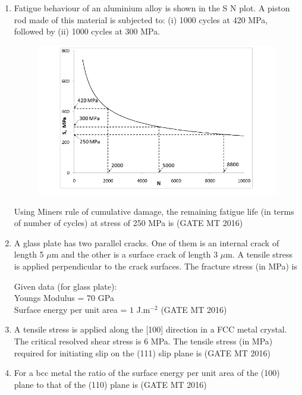 \documentclass[11pt, letterpaper]{article}
\theoremstyle{remark}
\begin{document}
\begin{enumerate}
\item Fatigue behaviour of an aluminium alloy is shown in the S N plot. A piston rod made of this material is subjected to:  
(i) 1000 cycles at 420 MPa, followed by  
(ii) 1000 cycles at 300 MPa.  
\begin{figure}[H]
    \centering
    \includegraphics[width=1\linewidth]{figs/image7'.png}
    \caption{}
    \label{fig:placeholder}
\end{figure}

Using Miner\textquotesingle s rule of cumulative damage, the remaining fatigue life (in terms of number of cycles) at stress of 250 MPa is
\hfill(GATE MT 2016)

\item A glass plate has two parallel cracks. One of them is an internal crack of length 5 $\mu$m and the other is a surface crack of length 3 $\mu$m. A tensile stress is applied perpendicular to the crack surfaces. The fracture stress (in MPa) is  

\noindent Given data (for glass plate):\\  
Young\textquotesingle s Modulus = $70$ GPa \\ 
Surface energy per unit area = $1$ J.m$^{-2}$  
\hfill(GATE MT 2016)

\item A tensile stress is applied along the [100] direction in a FCC metal crystal. The critical resolved shear stress is 6 MPa. The tensile stress (in MPa) required for initiating slip on the (111) slip plane is
\hfill(GATE MT 2016)

\item For a bcc metal the ratio of the surface energy per unit area of the (100) plane to that of the (110) plane is 
\hfill(GATE MT 2016)


\end{enumerate}
\end{document}

